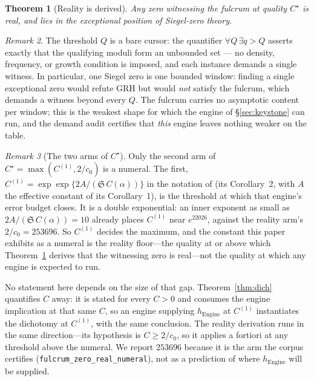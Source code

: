 \documentclass{CUP-JNL-FMP}
\newcommand{\leanname}[1]{\par\noindent{\small\texttt{#1}}}
\newcommand{\leaninline}[1]{{\small\texttt{#1}}}
\newtheorem{theorem}{Theorem}[section]
\theoremstyle{remark}
\newtheorem{remark}[theorem]{Remark}
\begin{document}
\begin{theorem}[Reality is derived]\label{thm:fulcrumreal}
Any zero witnessing the fulcrum at quality $C^\star$ is real, and lies in
the exceptional position of Siegel-zero theory.
\leanname{Salt.Fulcrum.fulcrum\_zero\_real}
\end{theorem}

\begin{remark}
The threshold $Q$ is a bare cursor: the quantifier
$\forall Q\,\exists q > Q$ asserts exactly that the qualifying moduli
form an unbounded set --- no density, frequency, or growth condition is
imposed, and each instance demands a single witness. In particular, one
Siegel zero is one bounded window: finding a single exceptional zero
would refute GRH but would \emph{not} satisfy the fulcrum, which demands
a witness beyond every $Q$. The fulcrum carries no asymptotic content
per window; this is the weakest shape for which the engine of
\S\ref{sec:keystone} can run, and the demand audit certifies that
\emph{this} engine leaves nothing weaker on the table.
\end{remark}

\begin{remark}[The two arms of $C^\star$]\label{rem:arms}
Only the second arm of $C^\star = \max(C^{(1)}, 2/c_0)$ is a numeral. The
first, $C^{(1)} = \exp\exp\{2A/(\mathfrak{S}\,C(\alpha))\}$ in the
notation of \cite{HB1983} (its Corollary~2, with $A$ the effective
constant of its Corollary~1), is the threshold at which that engine's
error budget closes. It is a double exponential: an inner exponent as
small as $2A/(\mathfrak{S}\,C(\alpha)) = 10$ already places $C^{(1)}$
near $e^{22026}$, against the reality arm's $2/c_0 = 253696$. So
$C^{(1)}$ decides the maximum, and the constant this paper exhibits as a
numeral is the reality floor---the quality at or above which
Theorem~\ref{thm:fulcrumreal} derives that the witnessing zero is
real---not the quality at which any engine is expected to run.

No statement here depends on the size of that gap.
Theorem~\ref{thm:dich} quantifies $C$ away: it is stated for every
$C > 0$ and consumes the engine implication at that same $C$, so an
engine supplying $h_{\mathrm{Engine}}$ at $C^{(1)}$ instantiates the
dichotomy at $C^{(1)}$, with the same conclusion. The reality derivation
runs in the same direction---its hypothesis is $C \ge 2/c_0$, so it
applies a fortiori at any threshold above the numeral. We report
$253696$ because it is the arm the corpus certifies
(\leaninline{fulcrum\_zero\_real\_numeral}), not as a prediction of where
$h_{\mathrm{Engine}}$ will be supplied.
\end{remark}
\end{document}
